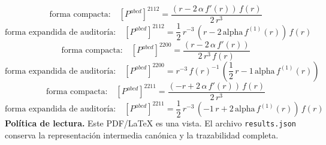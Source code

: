\documentclass[11pt]{article}
\begin{document}
\begin{dmath*}[breakdepth={5}]
\text{forma compacta:}\quad \left[P^{abcd}\right]^{2112} = \frac{\left(r - 2\,\alpha\,f'\!\left(r\right)\right)\,f\!\left(r\right)}{2\,{r}^{3}}
\end{dmath*}
\begin{dmath*}[breakdepth={5}]
\text{forma expandida de auditoría:}\quad \left[P^{abcd}\right]^{2112} = \frac{1}{2}\,{r}^{-3}\,\left(r - 2\,\mathrm{alpha}\,f^{(1)}\!\left(r\right)\right)\,f\!\left(r\right)
\end{dmath*}
\begin{dmath*}[breakdepth={5}]
\text{forma compacta:}\quad \left[P^{abcd}\right]^{2200} = \frac{\left(r - 2\,\alpha\,f'\!\left(r\right)\right)}{2\,{r}^{3}\,f\!\left(r\right)}
\end{dmath*}
\begin{dmath*}[breakdepth={5}]
\text{forma expandida de auditoría:}\quad \left[P^{abcd}\right]^{2200} = {r}^{-3}\,{f\!\left(r\right)}^{-1}\,\left(\frac{1}{2}\,r - 1\,\mathrm{alpha}\,f^{(1)}\!\left(r\right)\right)
\end{dmath*}
\begin{dmath*}[breakdepth={5}]
\text{forma compacta:}\quad \left[P^{abcd}\right]^{2211} = \frac{\left(-r + 2\,\alpha\,f'\!\left(r\right)\right)\,f\!\left(r\right)}{2\,{r}^{3}}
\end{dmath*}
\begin{dmath*}[breakdepth={5}]
\text{forma expandida de auditoría:}\quad \left[P^{abcd}\right]^{2211} = \frac{1}{2}\,{r}^{-3}\,\left(-1\,r + 2\,\mathrm{alpha}\,f^{(1)}\!\left(r\right)\right)\,f\!\left(r\right)
\end{dmath*}
\bigskip\noindent\textbf{Política de lectura.} Este PDF/LaTeX es una vista. El archivo \texttt{results.json} conserva la representación intermedia canónica y la trazabilidad completa.
\end{document}
